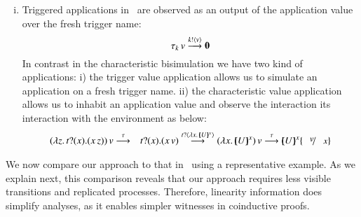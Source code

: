 \begin{enumerate}[i)]
	\item 	Triggered applications in~\cite{JeffreyR05}
		are observed as an output of the application
		value over the fresh trigger name:
		\[
			\tau_k\,v \stackrel{k ! \langle v \rangle}{\longrightarrow} \mathbf{0}
		\]
		In contrast in the characteristic bisimulation
		we have two kind of applications:
		i) the trigger value application allows us
		to simulate an application on a fresh trigger name.
		ii) the characteristic value application
		allows us to inhabit an application value 
		and observe the interaction its interaction
		with the environment as below: 
		\begin{eqnarray*}
			\appl{(\abs{z}{\binp{t}{x} (\appl{x}{z})})}{v} &\by{\tau}& \binp{t}{x} (\appl{x}{v})
			\by{\bactinp{t}{\abs{x}{\mapchar{U}{x}}}}
			\appl{(\abs{x}{\mapchar{U}{x}})}{v}
			\by{\tau} \mapchar{U}{x} \subst{v}{x}
		\end{eqnarray*}
\end{enumerate}

\smallskip

 We now compare our approach to that in~\cite{JeffreyR05} 
using a representative example.
As we explain next, this comparison %
reveals that our approach 
requires less visible transitions and replicated processes. 
Therefore, linearity information does simplify analyses, 
as it enables simpler witnesses in  coinductive proofs.



